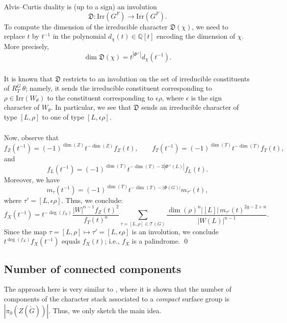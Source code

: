\documentclass[12pt]{amsart}
\theoremstyle{plain}
\theoremstyle{definition}
\theoremstyle{remark}
\newcommand{\ra}{\rightarrow}
\newcommand{\cT}{\mathcal{T}}
\newcommand{\Irr}{\mathrm{Irr}}
\begin{document}
\subsubsection{} Alvis--Curtis duality is (up to a sign) an involution 
\[
\mathfrak{D}: \Irr(G^F)\ra \Irr(G^F).
\]
To compute the dimension of the irreducible character $\mathfrak{D}(\chi)$, we need to replace $t$ by $t^{-1}$ in the polynomial $d_\chi(t)\in \mathbb{Q}[t]$ encoding the dimension of $\chi$. More precisely, 
\[
\dim \mathfrak{D}(\chi)=t^{|\Phi^+|} d_\chi (t^{-1}). 
\]

\subsubsection{} 
It is known that $\mathfrak{D}$ restricts to an involution on the set of irreducible constituents of $R_T^G\, \theta$; namely, it sends the irreducible constituent corresponding to $\rho \in \Irr(W_\theta)$ to the constituent corresponding to $\epsilon \rho$, where $\epsilon$ is the sign character of $W_\theta$. In particular, we see that $\mathfrak{D}$ sends an irreducible character of type $[L, \rho]$ to one of type $[L, \epsilon \rho]$. 


\subsubsection{} 
Now, observe that 
\[
f_Z(t^{-1}) = (-1)^{\dim(Z)} t^{-\dim(Z)} f_Z(t),\qquad f_T(t^{-1}) = (-1)^{\dim(T)} t^{-\dim(T)} f_T(t),
\]
and
\[
f_L(t^{-1}) = (-1)^{\dim(T)} t^{-\dim(T)-3|\Phi^+(L)|} f_L(t).
\]
Moreover, we have 
\[
m_\tau(t^{-1}) = (-1)^{\dim(T)} t^{-\dim(T)-|\Phi(G)|} m_{\tau'}(t),
\]
where $\tau' = [L,\epsilon\rho]$. Thus, we conclude: 
\[
f_X(t^{-1}) = t^{-\deg(f_X)} \frac{|W|^{n-1}f_Z(t)^2}{f_T(t)^n} \sum_{\tau=[L,\rho]\in\cT(G)} \frac{
\dim(\rho)^n  |[L]| \,m_{\tau'}(t)^{2g-2+n}
}{
|W(L)|^{n-1}
}.
\]
Since the map $\tau=[L,\rho]\mapsto \tau'=[L,\epsilon\rho]$ is an involution, we conclude $t^{\deg(f_X)}f_X(t^{-1})$ equals $f_X(t)$; i.e., $f_X$ is a palindrome. \qed 












\subsection{Number of connected components}  
The approach here is very similar to \cite[Corollary 5]{BK22}, where it is shown that the number of components of the character stack associated to a \emph{compact} surface group is $|\pi_0(Z(\check{G}))|$.  Thus, we only sketch the main idea.  
\end{document}
